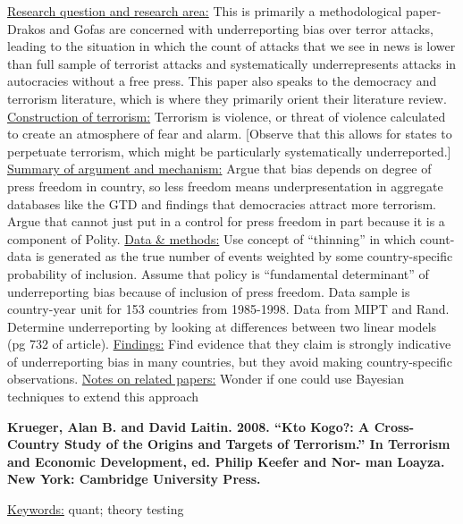 \documentclass{article}[12pt]
\begin{document}
\underline{Research question and research area:} This is primarily a methodological paper- Drakos and Gofas are concerned with underreporting bias over terror attacks, leading to the situation in which the count of attacks that we see in news is lower than full sample of terrorist attacks and systematically underrepresents attacks in autocracies without a free press. This paper also speaks to the democracy and terrorism literature, which is where they primarily orient their literature review.
\underline{Construction of terrorism:} Terrorism is violence, or threat of violence calculated to create an atmosphere of fear and alarm. [Observe that this allows for states to perpetuate terrorism, which might be particularly systematically underreported.] 
\underline{Summary of argument and mechanism:} Argue that bias depends on degree of press freedom in country, so less freedom means underpresentation in aggregate databases like the GTD and findings that democracies attract more terrorism. Argue that cannot just put in a control for press freedom in part because it is a component of Polity.
\underline{Data \& methods:} Use concept of ``thinning'' in which count-data is generated as the true number of events weighted by some country-specific probability of inclusion. Assume that policy is ``fundamental determinant'' of underreporting bias because of inclusion of press freedom. Data sample is country-year unit for 153 countries from 1985-1998. Data from MIPT and Rand. Determine underreporting by looking at differences between two linear models (pg 732 of article).
\underline{Findings:} Find evidence that they claim is strongly indicative of underreporting bias in many countries, but they avoid making country-specific observations.
\underline{Notes on related papers:} Wonder if one could use Bayesian techniques to extend this approach



\textbf{Krueger, Alan B. and David Laitin. 2008. “Kto Kogo?: A Cross-Country Study of the Origins and Targets of Terrorism.” In Terrorism and Economic Development, ed. Philip Keefer and Nor- man Loayza. New York: Cambridge University Press.}


\underline{Keywords:} quant; theory testing
\end{document}
